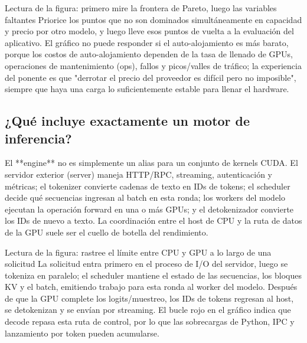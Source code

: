 
\begin{knowledgebox}{Lectura de la figura: primero mire la frontera de Pareto, luego las variables faltantes}
Priorice los puntos que no son dominados simultáneamente en capacidad y precio por otro modelo, y luego lleve esos puntos de vuelta a la evaluación del aplicativo. El gráfico no puede responder si el auto-alojamiento es más barato, porque los costos de auto-alojamiento dependen de la tasa de llenado de GPUs, operaciones de mantenimiento (ops), fallos y picos/valles de tráfico; la experiencia del ponente es que "derrotar el precio del proveedor es difícil pero no imposible", siempre que haya una carga lo suficientemente estable para llenar el hardware.
\end{knowledgebox}

\subsection{¿Qué incluye exactamente un motor de inferencia?}

El **engine** no es simplemente un alias para un conjunto de kernels CUDA. El servidor exterior (server) maneja HTTP/RPC, streaming, autenticación y métricas; el tokenizer convierte cadenas de texto en IDs de tokens; el scheduler decide qué secuencias ingresan al batch en esta ronda; los workers del modelo ejecutan la operación forward en una o más GPUs; y el detokenizador convierte los IDs de nuevo a texto. La coordinación entre el host de CPU y la ruta de datos de la GPU suele ser el cuello de botella del rendimiento.


\begin{knowledgebox}{Lectura de la figura: rastree el límite entre CPU y GPU a lo largo de una solicitud}
La solicitud entra primero en el proceso de I/O del servidor, luego se tokeniza en paralelo; el scheduler mantiene el estado de las secuencias, los bloques KV y el batch, emitiendo trabajo para esta ronda al worker del modelo. Después de que la GPU complete los logits/muestreo, los IDs de tokens regresan al host, se detokenizan y se envían por streaming. El bucle rojo en el gráfico indica que decode repasa esta ruta de control, por lo que las sobrecargas de Python, IPC y lanzamiento por token pueden acumularse.
\end{knowledgebox}

